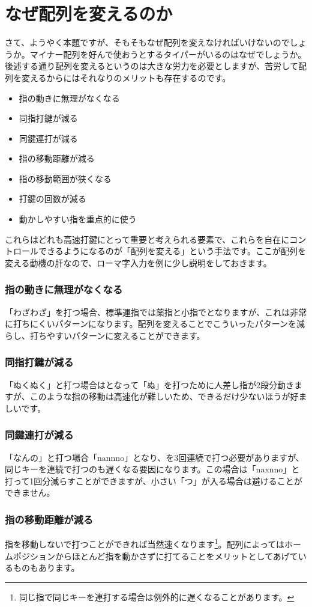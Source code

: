 \section{なぜ配列を変えるのか}

さて、ようやく本題ですが、そもそもなぜ配列を変えなければいけないのでしょうか。マイナー配列を好んで使おうとするタイパーがいるのはなぜでしょうか。後述する通り配列を変えるというのは大きな労力を必要としますが、苦労して配列を変えるからにはそれなりのメリットも存在するのです。

\begin{itemize}
 \item 指の動きに無理がなくなる
 \item 同指打鍵が減る
 \item 同鍵連打が減る
 \item 指の移動距離が減る
 \item 指の移動範囲が狭くなる
 \item 打鍵の回数が減る
 \item 動かしやすい指を重点的に使う
\end{itemize}
これらはどれも高速打鍵にとって重要と考えられる要素で、これらを自在にコントロールできるようになるのが「配列を変える」という手法です。ここが配列を変える動機の肝なので、ローマ字入力を例に少し説明をしておきます。

\subsubsection*{指の動きに無理がなくなる}
「わざわざ」を打つ場合、標準運指では薬指と小指でとなりますが、これは非常に打ちにくいパターンになります。配列を変えることでこういったパターンを減らし、打ちやすいパターンに変えることができます。
\subsubsection*{同指打鍵が減る}
「ぬくぬく」と打つ場合はとなって「ぬ」を打つために人差し指が2段分動きますが、このような指の移動は高速化が難しいため、できるだけ少ないほうが好ましいです。
\subsubsection*{同鍵連打が減る}
「なんの」と打つ場合「nannno」となり、を3回連続で打つ必要がありますが、同じキーを連続で打つのも遅くなる要因になります。この場合は「naxnno」と打って1回分減らすことができますが、小さい「つ」が入る場合は避けることができません。
\subsubsection*{指の移動距離が減る}
指を移動しないで打つことができれば当然速くなります\footnote{同じ指で同じキーを連打する場合は例外的に遅くなることがあります。}。配列によってはホームポジションからほとんど指を動かさずに打てることをメリットとしてあげているものもあります。
